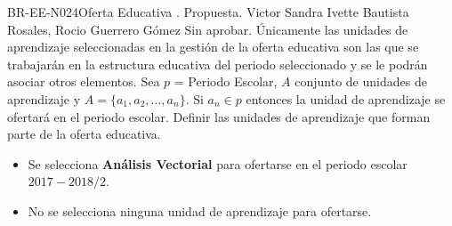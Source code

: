 \begin{BusinessRule}{BR-EE-N024}{Oferta Educativa}
	{\bcCondition}    %
	{\btEnabler}     %
	{\blControlling}    %
	.
	\BRItem[Estado] Propuesta.
	 Victor
	 Sandra Ivette Bautista Rosales, Rocio Guerrero Gómez
	 Sin aprobar.
	\BRItem[Descripción] Únicamente las unidades de aprendizaje seleccionadas en la gestión de la oferta educativa son las que se trabajarán en la estructura educativa del periodo seleccionado y se le podrán asociar otros elementos.
	\BRItem[Sentencia] Sea $p$ = Periodo Escolar, $A$ conjunto de unidades de aprendizaje y  $A = \{a_{1},a_{2},...,a_{n}\}$. Si $a_{n} \in p$ entonces la unidad de aprendizaje se ofertará en el periodo escolar.
	\BRItem[Motivación] Definir las unidades de aprendizaje que forman parte de la oferta educativa.
	 \cdtEmpty
	\begin{itemize}
			\item Se selecciona \textbf{Análisis Vectorial} para ofertarse en el periodo escolar $2017-2018/2$.
	\end{itemize}
	\begin{itemize}
		\item No se selecciona ninguna unidad de aprendizaje para ofertarse.
		\end{itemize}
\end{BusinessRule}

